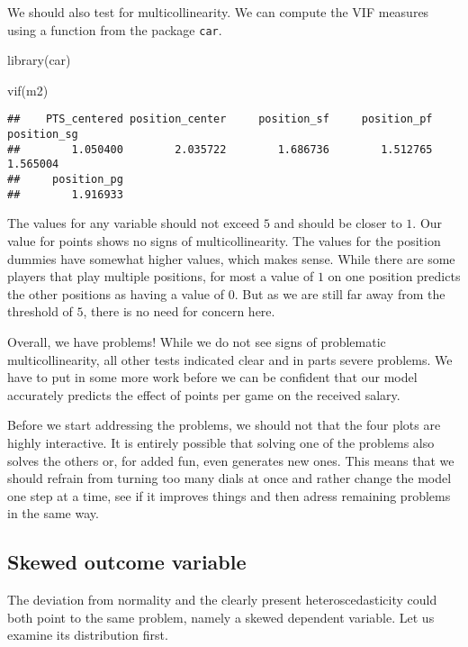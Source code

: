 \documentclass[
]{book}
\newenvironment{Shaded}{\begin{snugshade}}{\end{snugshade}}
\newcommand{\FunctionTok}[1]{\textcolor[rgb]{0.00,0.00,0.00}{#1}}
\newcommand{\FunctionTok}[1]{\textcolor[rgb]{0.13,0.29,0.53}{\textbf{#1}}}
\newcommand{\NormalTok}[1]{#1}
\begin{document}
We should also test for multicollinearity. We can compute the VIF measures using
a function from the package \texttt{car}.

\begin{Shaded}
\begin{Highlighting}[]
\FunctionTok{library}\NormalTok{(car)}

\FunctionTok{vif}\NormalTok{(m2)}
\end{Highlighting}
\end{Shaded}

\begin{verbatim}
##    PTS_centered position_center     position_sf     position_pf     position_sg 
##        1.050400        2.035722        1.686736        1.512765        1.565004 
##     position_pg 
##        1.916933
\end{verbatim}

The values for any variable should not exceed \(5\) and should be closer to \(1\).
Our value for points shows no signs of multicollinearity. The values for the
position dummies have somewhat higher values, which makes sense. While there are
some players that play multiple positions, for most a value of \(1\) on one
position predicts the other positions as having a value of \(0\). But as we are
still far away from the threshold of \(5\), there is no need for concern here.

Overall, we have problems! While we do not see signs of problematic
multicollinearity, all other tests indicated clear and in parts severe problems.
We have to put in some more work before we can be confident that our model
accurately predicts the effect of points per game on the received salary.

Before we start addressing the problems, we should not that the four plots are
highly interactive. It is entirely possible that solving one of the problems
also solves the others or, for added fun, even generates new ones. This means
that we should refrain from turning too many dials at once and rather change the
model one step at a time, see if it improves things and then adress remaining
problems in the same way.

\hypertarget{skewed-outcome-variable}{%
\subsection{Skewed outcome variable}\label{skewed-outcome-variable}}

The deviation from normality and the clearly present heteroscedasticity could
both point to the same problem, namely a skewed dependent variable. Let us
examine its distribution first.
\end{document}
